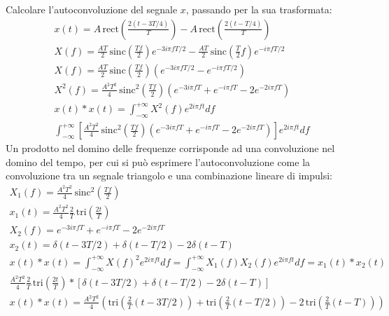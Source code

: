 \documentclass{article}
\begin{document}
Calcolare l'autoconvoluzione del segnale $x$, passando per la sua trasformata: 
\begin{gather*}
    x(t)=A\,\mbox{rect}\displaystyle\left(\frac{2(t-3T/4)}{T}\right)-A\,\mbox{rect}\displaystyle\left(\frac{2(t-T/4)}{T}\right)\\
    X(f)=\displaystyle\frac{AT}{2}\,\mbox{sinc}\left(\frac{Tf}{2}\right)e^{-3i\pi fT/2}-\displaystyle\frac{AT}{2}\,\mbox{sinc}\left(\frac{T}{2}f\right)e^{-i\pi fT/2}\\
    X(f)=\displaystyle\frac{AT}{2}\,\mbox{sinc}\left(\frac{Tf}{2}\right)\left(e^{-3i\pi fT/2}-e^{-i\pi fT/2}\right)\\
    X^2(f)=\displaystyle\frac{A^2T^2}{4}\,\mbox{sinc}^2\left(\frac{Tf}{2}\right)\left(e^{-3i\pi fT}+e^{-i\pi fT}-2e^{-2i\pi fT}\right)\\
    x(t)*x(t)=\displaystyle\int_{-\infty}^{+\infty}X^2(f)e^{2i\pi ft}df\\
    \displaystyle\int_{-\infty}^{+\infty}\left[\frac{A^2T^2}{4}\,\mbox{sinc}^2\left(\frac{Tf}{2}\right)\left(e^{-3i\pi fT}+e^{-i\pi fT}-2e^{-2i\pi fT}\right)\right]e^{2i\pi ft}df
\end{gather*}
Un prodotto nel domino delle frequenze corrisponde ad una convoluzione nel domino del tempo, per cui si può esprimere l'autoconvoluzione come la convoluzione tra un segnale 
triangolo e una combinazione lineare di impulsi:
\begin{gather*}
    X_1(f)=\displaystyle\frac{A^2T^2}{4}\,\mbox{sinc}^2\left(\frac{Tf}{2}\right)\\
    x_1(t)=\displaystyle\frac{A^2T^2}{4}\frac{2}{T}\,\mbox{tri}\left(\frac{2t}{T}\right)\\
    X_2(f)=e^{-3i\pi fT}+e^{-i\pi fT}-2e^{-2i\pi fT}\\
    x_2(t)=\delta(t-3T/2)+\delta(t-T/2)-2\delta(t-T)\\
    x(t)*x(t)=\displaystyle\int_{-\infty}^{+\infty}X(f)^2e^{2i\pi ft}df=\int_{-\infty}^{+\infty}X_1(f)X_2(f)e^{2i\pi ft}df=x_1(t)*x_2(t)\\
    \displaystyle\frac{A^2T^2}{4}\frac{2}{T}\,\mbox{tri}\left(\frac{2t}{T}\right)*\left[\delta(t-3T/2)+\delta(t-T/2)-2\delta(t-T)\right]
\end{gather*}
\begin{gather}
    x(t)*x(t)=\displaystyle\frac{A^2T^2}{4}\left(\mbox{tri}\left(\frac{2}{T}(t-3T/2)\right)+\mbox{tri}\left(\frac{2}{T}(t-T/2)\right)-2\,\mbox{tri}\left(\frac{2}{T}(t-T)\right)\right)
\end{gather}
\end{document}

